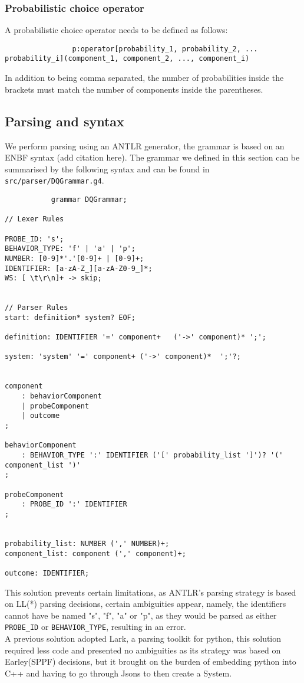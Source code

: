         \subsubsection{Probabilistic choice operator}
            A probabilistic choice operator needs to be defined as follows:
            \begin{verbatim}
                p:operator[probability_1, probability_2, ... probability_i](component_1, component_2, ..., component_i) 
            \end{verbatim}
            In addition to being comma separated, the number of probabilities inside the brackets must match the number of components inside the parentheses. 
    
    \subsection{Parsing and syntax}
        We perform parsing using an ANTLR generator, the grammar is based on an ENBF syntax (add citation here).
        The grammar we defined in this section can be summarised by the following syntax and can be found in \texttt{src/parser/DQGrammar.g4}.
        \begin{verbatim}
           grammar DQGrammar;

// Lexer Rules

PROBE_ID: 's';
BEHAVIOR_TYPE: 'f' | 'a' | 'p';
NUMBER: [0-9]*'.'[0-9]+ | [0-9]+;
IDENTIFIER: [a-zA-Z_][a-zA-Z0-9_]*;
WS: [ \t\r\n]+ -> skip;


// Parser Rules
start: definition* system? EOF;

definition: IDENTIFIER '=' component+   ('->' component)* ';';

system: 'system' '=' component+ ('->' component)*  ';'?;


component
    : behaviorComponent
    | probeComponent
    | outcome
;

behaviorComponent
    : BEHAVIOR_TYPE ':' IDENTIFIER ('[' probability_list ']')? '(' component_list ')'
;

probeComponent
    : PROBE_ID ':' IDENTIFIER
;


probability_list: NUMBER (',' NUMBER)+;
component_list: component (',' component)+;

outcome: IDENTIFIER;
        \end{verbatim}

        This solution prevents certain limitations, as ANTLR's parsing strategy is based on LL(*) parsing decisions, certain ambiguities appear, namely, the identifiers cannot have be named "s", "f", "a" or "p", as they would be parsed as either \texttt{PROBE\_ID} or \texttt{BEHAVIOR\_TYPE}, resulting in an error. \\

        A previous solution adopted Lark, a parsing toolkit for python, this solution required less code and presented no ambiguities as its strategy was based on Earley(SPPF) decisions, but it  brought on the burden of embedding python into C++ and having to go through Jsons to then create a System.
